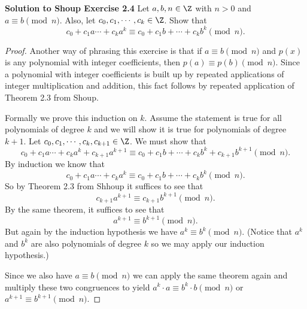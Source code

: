 \documentclass[oneside,12pt]{amsart}
\begin{document}
\bigskip

\textbf{Solution to Shoup Exercise 2.4} Let $a,b,n\in\Z$ with $n>0$ and $a\equiv b \pmod n$. Also, let
$c_0,c_1,\cdots,c_k \in \Z$. Show that
$$c_0+c_1a  \cdots + c_ka^k \equiv c_0 +c_1 b + \cdots + c_k b^k \pmod n.$$

\begin{proof}
Another way of phrasing this exercise is that if $a\equiv b \pmod n$ and $p(x)$ is any polynomial with
integer coefficients, then $p(a) \equiv p(b) \pmod n$. Since a polynomial with integer coefficients
is built up by repeated applications of integer multiplication and addition, this fact follows by repeated application
of Theorem 2.3 from Shoup.


Formally we prove this induction on $k$. 
Assume the statement is true for all polynomials of degree $k$ and we will show it is true for 
polynomials of degree $k+1$.
Let $c_0,c_1,\cdots,c_k,c_{k+1} \in \Z$. We must show that 
$$c_0+c_1a  \cdots + c_ka^k + c_{k+1}a^{k+1} \equiv c_0 +c_1 b + \cdots + c_k b^k + c_{k+1}b^{k+1} \pmod n.$$
By induction we know that
$$c_0+c_1a \cdots + c_ka^k \equiv c_0 +c_1 b + \cdots + c_k b^k \pmod n.$$
So by Theorem 2.3 from Shhoup it suffices to see that
$$c_{k+1}a^{k+1} \equiv c_{k+1}b^{k+1} \pmod n.$$
By the same theorem, it suffices to see that 
$$a^{k+1} \equiv b^{k+1} \pmod n.$$
But again by the induction hypothesis we have $a^k \equiv b^k \pmod n$. (Notice that $a^k$ and $b^k$ are also polynomials of degree $k$
so we may apply our induction hypothesis.)

Since we also have $a \equiv b \pmod n$
we can apply the same theorem again and multiply these two congruences to yield
$a^k\cdot a \equiv b^k \cdot b \pmod n$ or $a^{k+1} \equiv b^{k+1} \pmod n.$
\end{proof}
\end{document}
